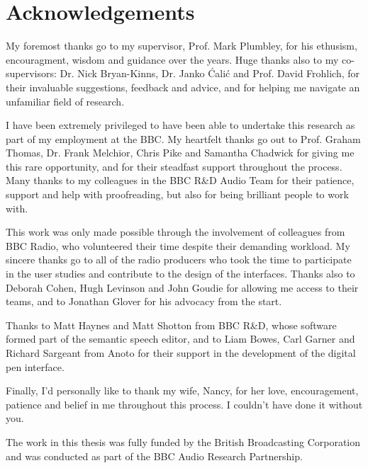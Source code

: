 \chapter*{Acknowledgements}

My foremost thanks go to my supervisor, Prof. Mark Plumbley, for his ethusism, encouragment, wisdom and guidance over
the years. Huge thanks also to my co-supervisors: Dr. Nick Bryan-Kinns, Dr. Janko \'{C}ali\'{c} and Prof.  David
Frohlich, for their invaluable suggestions, feedback and advice, and for helping me navigate an unfamiliar field of
research.

I have been extremely privileged to have been able to undertake this research as part of my employment at the BBC.  My
heartfelt thanks go out to Prof. Graham Thomas, Dr. Frank Melchior, Chris Pike and Samantha Chadwick for giving me this
rare opportunity, and for their steadfast support throughout the process.  Many thanks to my colleagues in the BBC R\&D
Audio Team for their patience, support and help with proofreading, but also for being brilliant people to work with.

This work was only made possible through the involvement of colleagues from BBC Radio, who volunteered their time
despite their demanding workload. My sincere thanks go to all of the radio producers who took the time to participate
in the user studies and contribute to the design of the interfaces. Thanks also to Deborah Cohen, Hugh Levinson and
John Goudie for allowing me access to their teams, and to Jonathan Glover for his advocacy from the start.

Thanks to Matt Haynes and Matt Shotton from BBC R\&D, whose software formed part of the semantic speech editor, and to
Liam Bowes, Carl Garner and Richard Sargeant from Anoto for their support in the development of the digital pen
interface. 

Finally, I'd personally like to thank my wife, Nancy, for her love, encouragement, patience and belief in me throughout
this process. I couldn't have done it without you.

\vfill
\noindent
The work in this thesis was fully funded by the British Broadcasting Corporation and was conducted as part of the BBC
Audio Research Partnership.
